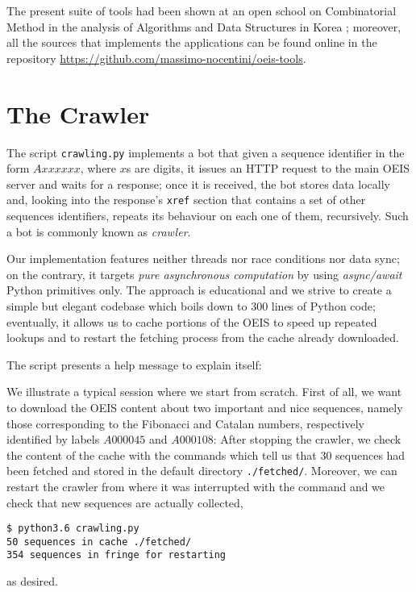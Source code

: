 The present suite of tools had been shown at an open school on Combinatorial
Method in the analysis of Algorithms and Data Structures in Korea
\citep{Nocentini:korea}; moreover, all the sources that implements the
applications can be found online in the repository
\url{https://github.com/massimo-nocentini/oeis-tools}.

\section{The Crawler}

The script \verb|crawling.py| implements a bot that given a sequence identifier
in the form $Axxxxxx$, where $x$s are digits, it issues an HTTP request to the
main OEIS server and waits for a response; once it is received, the bot stores
data locally and, looking into the response's \verb|xref| section that contains a
set of other sequences identifiers, repeats its behaviour on each one of them,
recursively.  Such a bot is commonly known as \emph{crawler}.

Our implementation features neither threads nor race conditions nor data sync;
on the contrary, it targets \textit{pure asynchronous computation} by using
\textit{async/await} Python primitives only. The approach is educational and we
strive to create a simple but elegant codebase which boils down to $300$ lines
of Python code; eventually, it allows us to cache portions of the OEIS to speed
up repeated lookups and to restart the fetching process from the cache already
downloaded.

The script presents a help message to explain itself:

\begin{example}
We illustrate a typical session where we start from scratch. First of all, we
want to download the OEIS content about two important and nice sequences,
namely those corresponding to the Fibonacci and Catalan numbers, respectively
identified by labels $A000045$ and $A000108$:
After stopping the crawler, we check the content of the cache with the commands
which tell us that $30$ sequences had been fetched and stored in the default
directory \verb|./fetched/|.  Moreover, we can restart the crawler from where
it was interrupted with the command
and we check that new sequences are actually collected,
\begin{Verbatim}[baselinestretch=0.8]
$ python3.6 crawling.py
50 sequences in cache ./fetched/
354 sequences in fringe for restarting
\end{Verbatim}
as desired.
\end{example}

